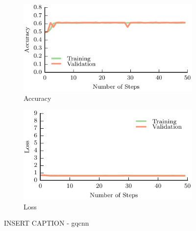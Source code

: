 \begin{figure}[t!]
    \centering
    \begin{subfigure}[t]{0.49\textwidth}
        \includegraphics[width=0.9\columnwidth]{figs/gqcnn_accuracy.pdf}
        \caption{Accuracy} \label{fig:accuracy}
        \end{subfigure}
    \begin{subfigure}[t]{0.49\textwidth}
        \includegraphics[width=0.9\columnwidth]{figs/gqcnn_loss.pdf}
        \caption{Loss} \label{fig:loss}
    \end{subfigure}
\caption{INSERT CAPTION - gqcnn} \label{fig:gqcnn_results}
\end{figure}